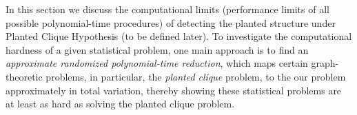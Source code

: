 
In this section we discuss the computational limits (performance limits of all possible polynomial-time procedures) of detecting the planted structure under Planted Clique Hypothesis (to be defined later). To investigate the computational hardness of a given statistical problem, one main approach is to find an \emph{approximate randomized polynomial-time reduction}, 
which maps certain graph-theoretic problems, in particular, the \emph{planted clique} problem, to the our problem approximately in total variation, thereby showing these statistical problems are at least as hard as solving the  planted clique problem.

 

